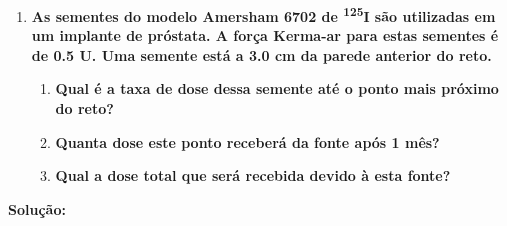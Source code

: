 \documentclass[11pt,a4paper]{article}
\begin{document}
			\begin{enumerate}
				\item \textbf{As sementes do modelo Amersham 6702 de \textsuperscript{125}I são utilizadas em um implante de próstata. A força Kerma-ar para estas sementes é de 0.5 U. Uma semente está a 3.0 cm da parede anterior do reto.}
				
					\begin{enumerate}
						\item \textbf{Qual é a taxa de dose dessa semente até o ponto mais próximo do reto?}
						\item \textbf{Quanta dose este ponto receberá da fonte após 1 mês?}
						\item \textbf{Qual a dose total que será recebida devido à esta fonte?}
					\end{enumerate}
			\end{enumerate}

			\textbf{\textcolor{CarnationPink}{Solução:}}
\end{document}
